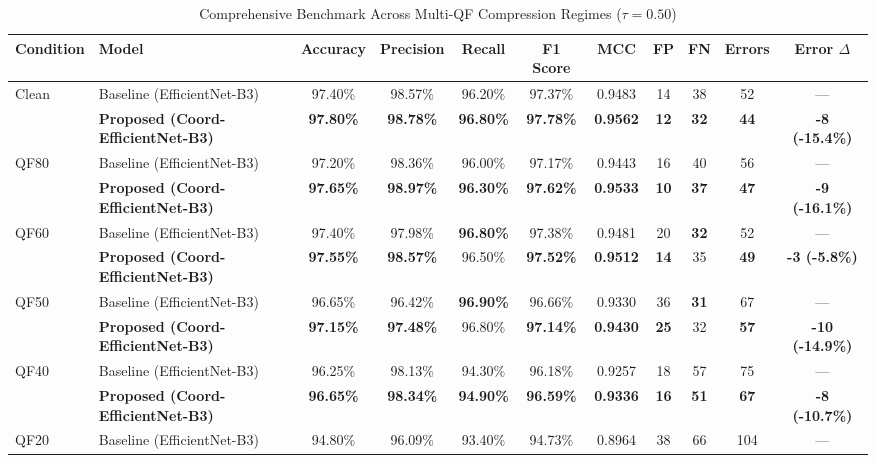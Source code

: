 \documentclass[conference]{IEEEtran}
\begin{document}
\begin{table}[t]
\caption{Comprehensive Benchmark Across Multi-QF Compression Regimes ($\tau = 0.50$)}
\label{tab:master}
\centering
\begin{tabular}{llccccccccc}
\toprule
\textbf{Condition} & \textbf{Model} & \textbf{Accuracy} & \textbf{Precision} & \textbf{Recall} & \textbf{F1 Score} & \textbf{MCC} & \textbf{FP} & \textbf{FN} & \textbf{Errors} & \textbf{Error $\Delta$} \\
\midrule
Clean & Baseline (EfficientNet-B3) & 97.40\% & 98.57\% & 96.20\% & 97.37\% & 0.9483 & 14 & 38 & 52 & --- \\
      & \textbf{Proposed (Coord-EfficientNet-B3)} & \textbf{97.80\%} & \textbf{98.78\%} & \textbf{96.80\%} & \textbf{97.78\%} & \textbf{0.9562} & \textbf{12} & \textbf{32} & \textbf{44} & \textbf{-8 (-15.4\%)} \\
\midrule
QF80  & Baseline (EfficientNet-B3) & 97.20\% & 98.36\% & 96.00\% & 97.17\% & 0.9443 & 16 & 40 & 56 & --- \\
      & \textbf{Proposed (Coord-EfficientNet-B3)} & \textbf{97.65\%} & \textbf{98.97\%} & \textbf{96.30\%} & \textbf{97.62\%} & \textbf{0.9533} & \textbf{10} & \textbf{37} & \textbf{47} & \textbf{-9 (-16.1\%)} \\
\midrule
QF60  & Baseline (EfficientNet-B3) & 97.40\% & 97.98\% & \textbf{96.80\%} & 97.38\% & 0.9481 & 20 & \textbf{32} & 52 & --- \\
      & \textbf{Proposed (Coord-EfficientNet-B3)} & \textbf{97.55\%} & \textbf{98.57\%} & 96.50\% & \textbf{97.52\%} & \textbf{0.9512} & \textbf{14} & 35 & \textbf{49} & \textbf{-3 (-5.8\%)} \\
\midrule
QF50  & Baseline (EfficientNet-B3) & 96.65\% & 96.42\% & \textbf{96.90\%} & 96.66\% & 0.9330 & 36 & \textbf{31} & 67 & --- \\
      & \textbf{Proposed (Coord-EfficientNet-B3)} & \textbf{97.15\%} & \textbf{97.48\%} & 96.80\% & \textbf{97.14\%} & \textbf{0.9430} & \textbf{25} & 32 & \textbf{57} & \textbf{-10 (-14.9\%)} \\
\midrule
QF40  & Baseline (EfficientNet-B3) & 96.25\% & 98.13\% & 94.30\% & 96.18\% & 0.9257 & 18 & 57 & 75 & --- \\
      & \textbf{Proposed (Coord-EfficientNet-B3)} & \textbf{96.65\%} & \textbf{98.34\%} & \textbf{94.90\%} & \textbf{96.59\%} & \textbf{0.9336} & \textbf{16} & \textbf{51} & \textbf{67} & \textbf{-8 (-10.7\%)} \\
\midrule
QF20  & Baseline (EfficientNet-B3) & 94.80\% & 96.09\% & 93.40\% & 94.73\% & 0.8964 & 38 & 66 & 104 & --- \\

\end{tabular}
\end{table}
\end{document}
